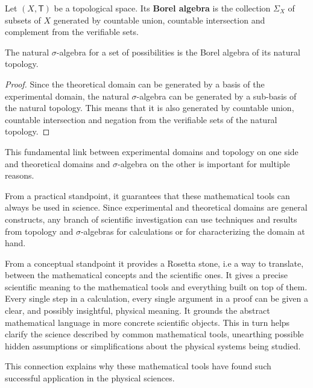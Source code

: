 \documentclass[11pt,letterpaper,fleqn]{memoir} %
\begin{document}
\begin{mathSection}
	
	\begin{defn}
		Let $(X, \mathsf{T})$ be a topological space. Its \textbf{Borel algebra} is the collection $\Sigma_X$ of subsets of $X$ generated by countable union, countable intersection and complement from the verifiable sets.
	\end{defn}
	
	\begin{prop}
		The natural $\sigma$-algebra for a set of possibilities is the Borel algebra of its natural topology.
	\end{prop}
	
	\begin{proof}
		Since the theoretical domain can be generated by a basis of the experimental domain, the natural $\sigma$-algebra can be generated by a sub-basis of the natural topology. This means that it is also generated by countable union, countable intersection and negation from the verifiable sets of the natural topology.
	\end{proof}
\end{mathSection}

This fundamental link between experimental domains and topology on one side and theoretical domains and $\sigma$-algebra on the other is important for multiple reasons.

From a practical standpoint, it guarantees that these mathematical tools can always be used in science. Since experimental and theoretical domains are general constructs, any branch of scientific investigation can use techniques and results from topology and $\sigma$-algebras for calculations or for characterizing the domain at hand.

From a conceptual standpoint it provides a Rosetta stone, i.e a way to translate, between the mathematical concepts and the scientific ones. It gives a precise scientific meaning to the mathematical tools and everything built on top of them. Every single step in a calculation, every single argument in a proof can be given a clear, and possibly insightful, physical meaning. It grounds the abstract mathematical language in more concrete scientific objects. This in turn helps clarify the science described by common mathematical tools, unearthing possible hidden assumptions or simplifications about the physical systems being studied.

This connection explains why these mathematical tools have found such successful application in the physical sciences.
\end{document}
